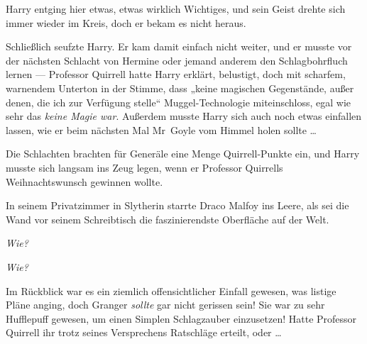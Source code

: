 Harry entging hier etwas, etwas wirklich Wichtiges, und sein Geist drehte sich immer wieder im Kreis, doch er bekam es nicht heraus.

Schließlich seufzte Harry. Er kam damit einfach nicht weiter, und er musste vor der nächsten Schlacht von Hermine oder jemand anderem den Schlagbohrfluch lernen — Professor Quirrell hatte Harry erklärt, belustigt, doch mit scharfem, warnendem Unterton in der Stimme, dass „keine magischen Gegenstände, außer denen, die ich zur Verfügung stelle“ Muggel-Technologie miteinschloss, egal wie sehr das \emph{keine Magie war}. Außerdem musste Harry sich auch noch etwas einfallen lassen, wie er beim nächsten Mal Mr~Goyle vom Himmel holen sollte … %

Die Schlachten brachten für Generäle eine Menge Quirrell-Punkte ein, und Harry musste sich langsam ins Zeug legen, wenn er Professor Quirrells Weihnachtswunsch gewinnen wollte.

\later

In seinem Privatzimmer in Slytherin starrte Draco Malfoy ins Leere, als sei die Wand vor seinem Schreibtisch die faszinierendste Oberfläche auf der Welt.

\emph{Wie?}

\emph{Wie?}

Im Rückblick war es ein ziemlich offensichtlicher Einfall gewesen, was listige Pläne anging, doch Granger \emph{sollte} gar nicht gerissen sein! Sie war zu sehr Hufflepuff gewesen, um einen Simplen Schlagzauber einzusetzen! Hatte Professor Quirrell ihr trotz seines Versprechens Ratschläge erteilt, oder …

